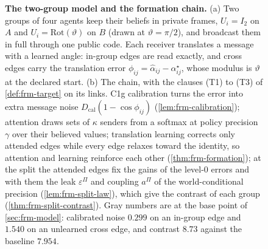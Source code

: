 \begin{figure}[!tp]
  \centering
  
  \caption{\textbf{The two-group model and the formation chain.} (a) Two groups of four agents keep their beliefs in private frames, $U_i=I_2$ on $A$ and $U_i=\mathrm{Rot}(\vartheta)$ on $B$ (drawn at $\vartheta=\pi/2$), and broadcast them in full through one public code. Each receiver translates a message with a learned angle: in-group edges are read exactly, and cross edges carry the translation error $\phi_{ij}=\hat\alpha_{ij}-\alpha^\star_{ij}$, whose modulus is $\vartheta$ at the declared start. (b) The chain, with the clauses (T1) to (T3) of \cref{def:frm-target} on its links. C1g calibration turns the error into extra message noise $D_{\mathrm{cal}}(1-\cos\phi_{ij})$ (\cref{lem:frm-calibration}); attention draws sets of $\kappa$ senders from a softmax at policy precision $\gamma$ over their believed values; translation learning corrects only attended edges while every edge relaxes toward the identity, so attention and learning reinforce each other (\cref{thm:frm-formation}); at the split the attended edges fix the gains of the level-0 errors and with them the leak $\varepsilon^\Pi$ and coupling $a^\Pi$ of the world-conditional precision (\cref{lem:frm-split-law}), which give the contrast of each group (\cref{thm:frm-split-contrast}). Gray numbers are at the base point of \cref{sec:frm-model}: calibrated noise $0.299$ on an in-group edge and $1.540$ on an unlearned cross edge, and contrast $8.73$ against the baseline $7.954$.}
  \label{fig:frm-chain}
\end{figure}

